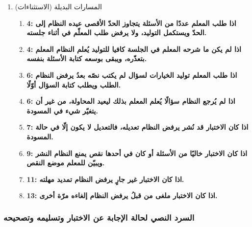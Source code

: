 \begin{enumerate}
  \item المسارات البديلة (الاستثناءات)
  \begin{enumerate}
    \item \textbf{4: اذا طلب المعلم عددًا من الأسئلة يتجاوز الحدّ الأقصى عيده النظام إلى الحدّ ويستكمل التوليد، ولا يرفض طلب المعلّم في أثناء جلسته. }
    \item \textbf{4: اذا لم يكن ما شرحه المعلم في الجلسة كافيا للتوليد يُعلم النظام المعلم بتعذّره، ويبقى بوسعه كتابة الأسئلة بنفسه. }
    \item \textbf{6: اذا طلب المعلم توليد الخيارات لسؤال لم يكتب نصّه بعدُ يرفض النظام الطلب ويطلب كتابة السؤال أوّلًا. }
    \item \textbf{6: اذا لم يُرجع النظام سؤالًا يُعلم المعلم بذلك ليعيد المحاولة، من غير أن يتغيّر شيء في المسودة. }
    \item \textbf{7: اذا كان الاختبار قد نُشر يرفض النظام تعديله، فالتعديل لا يكون إلّا في حالة المسودة. }
    \item \textbf{9: اذا كان الاختبار خاليًا من الأسئلة أو كان في أحدها نقص يمنع النظام النشر ويبيّن للمعلم موضع النقص. }
    \item \textbf{11: اذا كان الاختبار غير جارٍ يرفض النظام تمديد مهلته. }
    \item \textbf{13: اذا كان الاختبار ملغى من قبلُ يرفض النظام إلغاءه مرّة أخرى.}
  \end{enumerate}
\end{enumerate}

\subsubsection{السرد النصي لحالة الإجابة عن الاختبار وتسليمه وتصحيحه}
\label{subsubsec:uc-quiz-answer}

